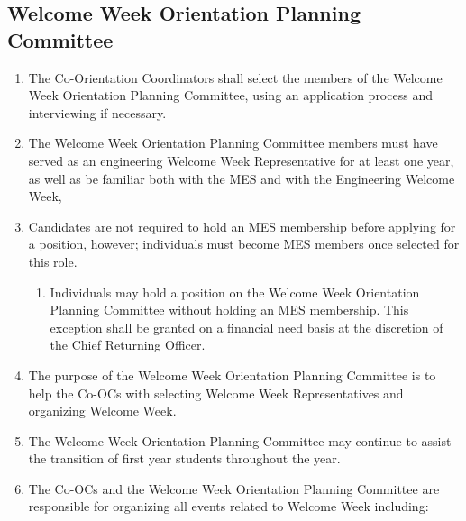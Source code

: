 \subsection{Welcome Week Orientation Planning Committee}
\label{welcome-week-orientation-planning-committee}
\begin{enumerate}
 \item
  The Co-Orientation Coordinators shall select the members of the Welcome Week Orientation Planning Committee, using an application process and interviewing if necessary.
 \item
  The Welcome Week Orientation Planning Committee members must have served as an engineering Welcome Week Representative for at least one year, as well as be familiar both with the MES and with the Engineering Welcome Week,
 \item
  Candidates are not required to hold an MES membership before applying for a position, however; individuals must become MES members once selected for this role.

  \begin{enumerate}
   \item
    Individuals may hold a position on the Welcome Week Orientation Planning Committee without holding an MES membership. This exception shall be granted on a financial need basis at the discretion of the Chief Returning Officer.
  \end{enumerate}
 \item
  The purpose of the Welcome Week Orientation Planning Committee is to help the Co-OCs with selecting Welcome Week Representatives and organizing Welcome Week.
 \item
  The Welcome Week Orientation Planning Committee may continue to assist the transition of first year students throughout the year.
 \item
  The Co-OCs and the Welcome Week Orientation Planning Committee are responsible for organizing all events related to Welcome Week including:


\end{enumerate}
